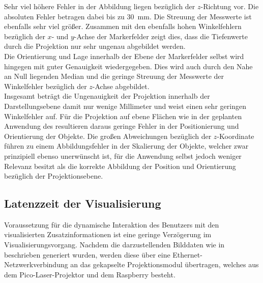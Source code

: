 Sehr viel höhere Fehler in der Abbildung liegen bezüglich der $z$-Richtung vor. Die absoluten Fehler betragen dabei bis zu \SI{30}{\milli\meter}. Die Streuung der Messwerte ist ebenfalls sehr viel größer. Zusammen mit den ebenfalls hohen Winkelfehlern bezüglich der $x$- und $y$-Achse der Markerfelder zeigt dies, dass die Tiefenwerte durch die Projektion nur sehr ungenau abgebildet werden.\\
Die Orientierung und Lage innerhalb der Ebene der Markerfelder selbst wird hingegen mit guter Genauigkeit wiedergegeben. Dies wird auch durch den Nahe an Null liegenden Median und die geringe Streuung der Messwerte der Winkelfehler bezüglich der $z$-Achse abgebildet.\\

Insgesamt beträgt die Ungenauigkeit der Projektion innerhalb der Darstellungsebene damit nur wenige Millimeter und weist einen sehr geringen Winkelfehler auf. Für die Projektion auf ebene Flächen wie in der geplanten Anwendung des  resultieren daraus geringe Fehler in der Positionierung und Orientierung der Objekte. Die großen Abweichungen bezüglich der $z$-Koordinate führen zu einem Abbildungsfehler in der Skalierung der Objekte, welcher zwar prinzipiell ebenso unerwünscht ist, für die Anwendung selbst jedoch weniger Relevanz besitzt als die korrekte Abbildung der Position und Orientierung bezüglich der Projektionsebene.\\



%

\subsection{Latenzzeit der Visualisierung}
Voraussetzung für die dynamische Interaktion des Benutzers mit den visualisierten Zusatzinformationen ist eine geringe Verzögerung im Visualisierungsvorgang. Nachdem die darzustellenden Bilddaten wie in  beschrieben generiert wurden, werden diese über eine Ethernet-Netzwerkverbindung an das gekapselte Projektionsmodul übertragen, welches aus dem Pico-Laser-Projektor und dem Raspberry besteht.\\

